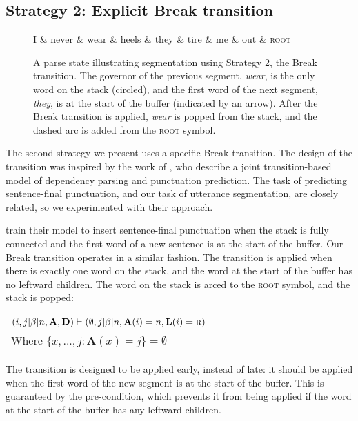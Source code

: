 \documentclass[11pt,letterpaper]{article}
\begin{document}
\subsection{Strategy 2: Explicit Break transition}
\label{sec:break}
\begin{figure}
\begin{dependency}[theme=simple, edge unit distance=1.0ex]
    \begin{deptext}[row sep=2.0ex]
        I \& never \& wear \& heels \& they \& tire \& me \& out \& \textsc{root} \\
    \end{deptext}

    \end{dependency}
    \caption{\small A parse state illustrating segmentation using Strategy 2,
        the Break transition.
        The governor of the previous segment,
        \emph{wear},  is
        the only word on the stack (circled), and the first word of the
        next segment, \emph{they}, is at the start of the buffer (indicated by
        an arrow). After the Break transition is applied, \emph{wear} is popped
    from the stack, and the dashed arc is added from the \textsc{root} symbol.
    \label{fig:break_state}}
\end{figure}
The second strategy we present uses a specific Break transition.  
The design of the transition was inspired by the work of \citet{dongzhang:13},
who describe a joint transition-based model of dependency parsing and punctuation
prediction.  The task of predicting sentence-final punctuation, and our task of
utterance segmentation, are closely related, so we experimented with their
approach.

\citet{dongzhang:13} train their model to insert sentence-final punctuation when
the stack is fully connected and the first word of a new sentence is at the start
of the buffer. Our Break transition operates in a similar fashion.
The transition is applied when there is exactly one word on the stack, and the
word at the start of the buffer has no leftward children.  The word on the stack
is arced to the \textsc{root} symbol, and the stack is popped:
\vspace*{-1em}
\begin{center}
    \begin{tabular}{l}
        $(i, j | \beta | n, \mathbf{A}, \mathbf{D}) \vdash (\emptyset, j | \beta | n, \mathbf{A}(i)=n, \mathbf{L}(i)=\textsc{r}) $ \\
    Where $\{x, ..., j : \mathbf{A}(x)=j \} = \emptyset$ \\
    \end{tabular}
\end{center}
The transition
is designed to be applied early, instead of late: it should be applied
when the first word of the new segment is at the start of the buffer.  This is
guaranteed by the pre-condition, which prevents it from being applied if the word at the start of the buffer has any leftward children.
\end{document}
